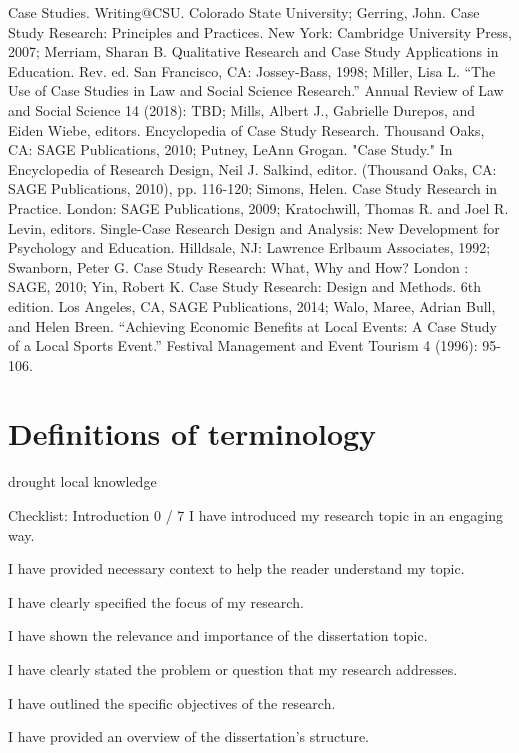 Case Studies. Writing@CSU. Colorado State University; Gerring, John. Case Study Research: Principles and Practices. New York: Cambridge University Press, 2007; Merriam, Sharan B. Qualitative Research and Case Study Applications in Education. Rev. ed. San Francisco, CA: Jossey-Bass, 1998; Miller, Lisa L. “The Use of Case Studies in Law and Social Science Research.” Annual Review of Law and Social Science 14 (2018): TBD; Mills, Albert J., Gabrielle Durepos, and Eiden Wiebe, editors. Encyclopedia of Case Study Research. Thousand Oaks, CA: SAGE Publications, 2010; Putney, LeAnn Grogan. "Case Study." In Encyclopedia of Research Design, Neil J. Salkind, editor. (Thousand Oaks, CA: SAGE Publications, 2010), pp. 116-120; Simons, Helen. Case Study Research in Practice. London: SAGE Publications, 2009; Kratochwill, Thomas R. and Joel R. Levin, editors. Single-Case Research Design and Analysis: New Development for Psychology and Education. Hilldsale, NJ: Lawrence Erlbaum Associates, 1992; Swanborn, Peter G. Case Study Research: What, Why and How? London : SAGE, 2010; Yin, Robert K. Case Study Research: Design and Methods. 6th edition. Los Angeles, CA, SAGE Publications, 2014; Walo, Maree, Adrian Bull, and Helen Breen. “Achieving Economic Benefits at Local Events: A Case Study of a Local Sports Event.” Festival Management and Event Tourism 4 (1996): 95-106.




\section{Definitions of terminology}

drought
local knowledge




Checklist: Introduction 0 / 7
I have introduced my research topic in an engaging way.

I have provided necessary context to help the reader understand my topic.

I have clearly specified the focus of my research.

I have shown the relevance and importance of the dissertation topic.

I have clearly stated the problem or question that my research addresses.

I have outlined the specific objectives of the research.

I have provided an overview of the dissertation’s structure.